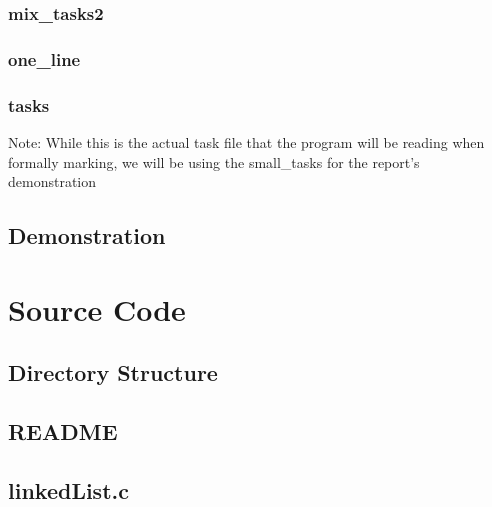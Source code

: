 \documentclass[a4paper, 12pt, titlepage]{article}
\begin{document}
\subsubsection{mix\_tasks2}


\subsubsection{one\_line}


\subsubsection{tasks}
\begin{multicols}{4}

\end{multicols}

Note: While this is the actual task file that the program will be reading when
formally marking, we will be using the small\_tasks for the report's
demonstration
\newpage

\subsection{Demonstration}

\newpage

\section{Source Code}

\subsection{Directory Structure}

\newpage

\subsection{README}

\newpage

\subsection{linkedList.c}

\newpage
\end{document}
